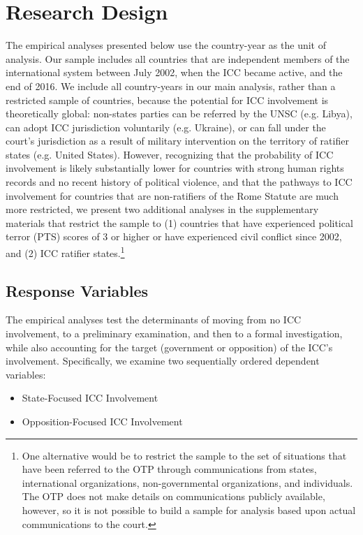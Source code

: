 \section*{Research Design}

The empirical analyses presented below use the country-year as the unit of analysis. Our sample includes all countries that are independent members of the international system between July 2002, when the ICC became active, and the end of 2016. We include all country-years in our main analysis, rather than a restricted sample of countries, because the potential for ICC involvement is theoretically global: non-states parties can be referred by the UNSC (e.g. Libya), can adopt ICC jurisdiction voluntarily (e.g. Ukraine), or can fall under the court's jurisdiction as a result of military intervention on the territory of ratifier states (e.g. United States). However, recognizing that the probability of ICC involvement is likely substantially lower for countries with strong human rights records and no recent history of political violence, and that the pathways to ICC involvement for countries that are non-ratifiers of the Rome Statute are much more restricted, we present two additional analyses in the supplementary materials that restrict the sample to (1) countries that have experienced political terror (PTS) scores of 3 or higher or have experienced civil conflict since 2002, and (2) ICC ratifier states.\footnote{One alternative would be to restrict the sample to the set of situations that have been referred to the OTP through communications from states, international organizations, non-governmental organizations, and individuals. The OTP does not make details on communications publicly available, however, so it is not possible to build a sample for analysis based upon actual communications to the court.}

\subsection*{Response Variables}

The empirical analyses test the determinants of moving from no ICC involvement, to a preliminary examination, and then to a formal investigation, while also accounting for the target (government or opposition) of the ICC's involvement. Specifically, we examine two sequentially ordered dependent variables:

\begin{itemize}
	\item State-Focused ICC Involvement
	\item Opposition-Focused ICC Involvement
\end{itemize}

